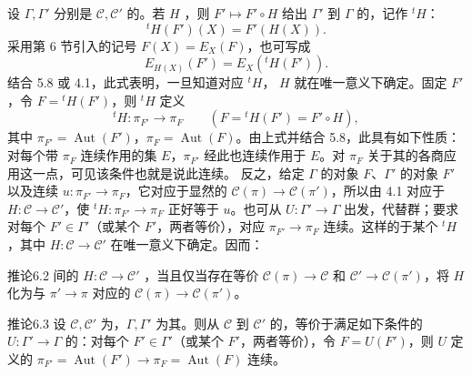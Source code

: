 设 $\Gamma,\Gamma'$ 分别是 $\mathcal C,\mathcal C'$ 的。若 $H$ ，则 $F'\mapsto F'\circ H$ 给出 $\Gamma'$ 到 $\Gamma$ 的，记作 ${}^tH$：
\[{}^tH(F')(X)=F'(H(X)).\]
采用第 6 节引入的记号 $F(X)=E_X(F)$，也可写成
\[E_{H(X)}(F')=E_X({}^tH(F')).\]
结合 5.8 或 4.1，此式表明，一旦知道对应 ${}^tH$， $H$ 就在唯一意义下确定。固定 $F'$，令 $F={}^tH(F')$，则 ${}^tH$ 定义
\[{}^tH:\pi_{F'}\longrightarrow\pi_F\qquad(F={}^tH(F')=F'\circ H),\]
其中 $\pi_{F'}=\operatorname{Aut}(F')$，$\pi_F=\operatorname{Aut}(F)$。由上式并结合 5.8，此具有如下性质：对每个带 $\pi_F$ 连续作用的集 $E$，$\pi_{F'}$ 经此也连续作用于 $E$。对 $\pi_F$ 关于其的各商应用这一点，可见该条件也就是说此连续。
反之，给定 $\Gamma$ 的对象 $F$、$\Gamma'$ 的对象 $F'$ 以及连续 $u:\pi_{F'}\to\pi_F$，它对应于显然的 $\mathcal C(\pi)\to\mathcal C(\pi')$，所以由 4.1 对应于 $H:\mathcal C\to\mathcal C'$，使 ${}^tH:\pi_{F'}\to\pi_F$ 正好等于 $u$。也可从 $U:\Gamma'\to\Gamma$ 出发，代替群；要求对每个 $F'\in\Gamma'$（或某个 $F'$，两者等价），对应 $\pi_{F'}\to\pi_F$ 连续。这样的于某个 ${}^tH$，其中 $H:\mathcal C\to\mathcal C'$ 在唯一意义下确定。因而：
\begin{SGAresult}{推论}{6.2}
间的 $H:\mathcal C\to\mathcal C'$ ，当且仅当存在等价 $\mathcal C(\pi)\to\mathcal C$ 和 $\mathcal C'\to\mathcal C(\pi')$，将 $H$ 化为与 $\pi'\to\pi$ 对应的 $\mathcal C(\pi)\to\mathcal C(\pi')$。
\end{SGAresult}
\begin{SGAresult}{推论}{6.3}
设 $\mathcal C,\mathcal C'$ 为，$\Gamma,\Gamma'$ 为其。则从 $\mathcal C$ 到 $\mathcal C'$ 的，等价于满足如下条件的 $U:\Gamma'\to\Gamma$ 的：对每个 $F'\in\Gamma'$（或某个 $F'$，两者等价），令 $F=U(F')$，则 $U$ 定义的 $\pi_{F'}=\operatorname{Aut}(F')\to\pi_F=\operatorname{Aut}(F)$ 连续。
\end{SGAresult}
